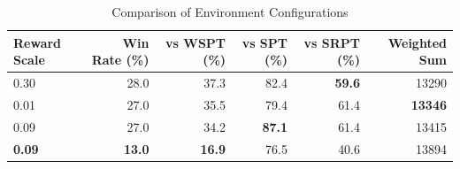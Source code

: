 \begin{table}[htbp]%
\centering%
\begin{tabular}{lrrrrr}%
\toprule%
\textbf{Reward Scale}&\textbf{Win Rate (\%)}&\textbf{vs WSPT (\%)}&\textbf{vs SPT (\%)}&\textbf{vs SRPT (\%)}&\textbf{Weighted Sum}\\%
\midrule%
0.30&28.0&37.3&82.4&\textbf{59.6}&13290\\%
0.01&27.0&35.5&79.4&61.4&\textbf{13346}\\%
0.09&27.0&34.2&\textbf{87.1}&61.4&13415\\%
\textbf{0.09}&\textbf{13.0}&\textbf{16.9}&76.5&40.6&13894\\%
\bottomrule%
\end{tabular}%
\caption{Comparison of Environment Configurations}%
\label{tab:environment}%
\end{table}